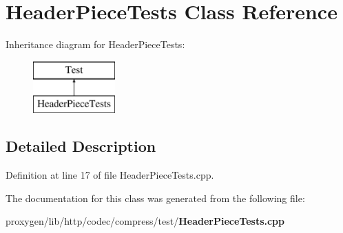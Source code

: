 \section{Header\+Piece\+Tests Class Reference}
\label{classHeaderPieceTests}
Inheritance diagram for Header\+Piece\+Tests\+:\begin{figure}[H]
\begin{center}
\leavevmode
\includegraphics[height=2.000000cm]{classHeaderPieceTests}
\end{center}
\end{figure}


\subsection{Detailed Description}


Definition at line 17 of file Header\+Piece\+Tests.\+cpp.



The documentation for this class was generated from the following file\+:\begin{DoxyCompactItemize}
\item 
proxygen/lib/http/codec/compress/test/{\bf Header\+Piece\+Tests.\+cpp}\end{DoxyCompactItemize}
